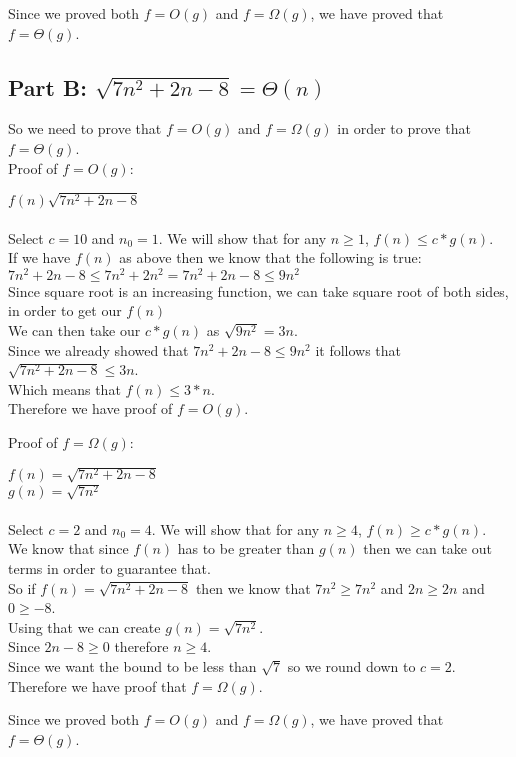 \documentclass[titlepage]{article}\pagestyle{empty}
\begin{document}
Since we proved both $f = O(g)$ and $f = \Omega(g)$, we have proved that $f = \Theta(g)$.

\subsection*{Part B: $\sqrt{7n^2 + 2n - 8} = \Theta(n)$}
So we need to prove that $f = O(g)$ and $f = \Omega(g)$ in order to prove that $f = \Theta(g)$.\\
Proof of $f = O(g)$:
\begin{center}
$f(n)\sqrt{7n^2 + 2n - 8}$\\~\\
Select $c = 10$ and $n_0 = 1$. We will show that for any $n \geq 1$, $f(n) \leq c * g(n).$\\
If we have $f(n)$ as above then we know that the following is true:\\
$7n^2 + 2n - 8 \leq 7n^2 + 2n^2 = 7n^2 + 2n - 8 \leq 9n^2$\\
Since square root is an increasing function, we can take square root of both sides, in order to get our $f(n)$\\
We can then take our $c * g(n)$ as $\sqrt{9n^2} = 3n$.\\
Since we already showed that $7n^2 + 2n - 8 \leq 9n^2$ it follows that $\sqrt{7n^2 + 2n - 8} \leq 3n$.\\
Which means that $f(n) \leq 3 * n$.\\
Therefore we have proof of $f = O(g)$.

\end{center}
Proof of $f = \Omega(g)$:
\begin{center}
$f(n) = \sqrt{7n^2 + 2n - 8}$\\
$g(n) = \sqrt{7n^2}$\\~\\
Select $c = 2$ and $n_0 = 4$. We will show that for any $n \geq 4$, $f(n) \geq c * g(n).$\\
We know that since $f(n)$ has to be greater than $g(n)$ then we can take out terms in order to guarantee that.\\
So if $f(n)=\sqrt{7n^2 + 2n - 8}$ then we know that $7n^2 \geq 7n^2$ and $2n \geq 2n$ and $0 \geq -8$.\\
Using that we can create $g(n) = \sqrt{7n^2}$.\\
Since $2n - 8 \geq 0$ therefore $n \geq 4$.\\ 
Since we want the bound to be less than $\sqrt{7}$ so we round down to $c = 2$.\\
Therefore we have proof that $f = \Omega(g)$.
\end{center}

Since we proved both $f = O(g)$ and $f = \Omega(g)$, we have proved that $f = \Theta(g)$.
\end{document}
